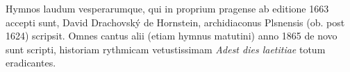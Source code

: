 Hymnos laudum vesperarumque, qui in proprium pragense ab editione
1663 accepti sunt, David Drachovský de Hornstein, archidiaconus Plsnensis
(ob. post 1624) scripsit.
Omnes cantus alii (etiam hymnus matutini) anno 1865 de novo sunt scripti,
historiam rythmicam vetustissimam \emph{Adest dies laetitiae}
totum eradicantes.
